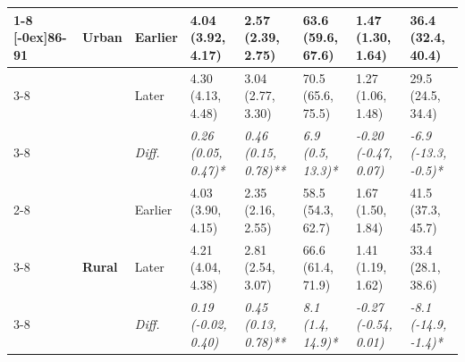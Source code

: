 \documentclass[12pt, a4paper]{article}
\begin{document}
\begin{appendices}
\begin{table}[!p]
{\begin{tabular}[t]{>{}l>{}lllllll}
        \cmidrule{1-8}
        \multirow{9}{*}[-0ex]{\textbf{86-91}} & \multirow{3}{*}{\textbf{Urban}} & Earlier                       & 4.04 (3.92, 4.17)                           & 2.57 (2.39, 2.75)                            & 63.6 (59.6, 67.6)                           & 1.47 (1.30, 1.64)                               & 36.4 (32.4, 40.4)                              \\
        \cmidrule{3-8}
                                              &                                 & Later                         & 4.30 (4.13, 4.48)                           & 3.04 (2.77, 3.30)                            & 70.5 (65.6, 75.5)                           & 1.27 (1.06, 1.48)                               & 29.5 (24.5, 34.4)                              \\
        \cmidrule{3-8}
                                              &                                 & \cellcolor{gray!10}\em{Diff.} & \cellcolor{gray!10}\em{0.26 (0.05, 0.47)*}  & \cellcolor{gray!10}\em{0.46 (0.15, 0.78)**}  & \cellcolor{gray!10}\em{6.9 (0.5, 13.3)*}    & \cellcolor{gray!10}\em{-0.20 (-0.47, 0.07)}     & \cellcolor{gray!10}\em{-6.9 (-13.3, -0.5)*}    \\
        \cmidrule{2-8}
                                              & \multirow{3}{*}{\textbf{Rural}} & Earlier                       & 4.03 (3.90, 4.15)                           & 2.35 (2.16, 2.55)                            & 58.5 (54.3, 62.7)                           & 1.67 (1.50, 1.84)                               & 41.5 (37.3, 45.7)                              \\
        \cmidrule{3-8}
                                              &                                 & Later                         & 4.21 (4.04, 4.38)                           & 2.81 (2.54, 3.07)                            & 66.6 (61.4, 71.9)                           & 1.41 (1.19, 1.62)                               & 33.4 (28.1, 38.6)                              \\
        \cmidrule{3-8}
                                              &                                 & \cellcolor{gray!10}\em{Diff.} & \cellcolor{gray!10}\em{0.19 (-0.02, 0.40)}  & \cellcolor{gray!10}\em{0.45 (0.13, 0.78)**}  & \cellcolor{gray!10}\em{8.1 (1.4, 14.9)*}    & \cellcolor{gray!10}\em{-0.27 (-0.54, 0.01)}     & \cellcolor{gray!10}\em{-8.1 (-14.9, -1.4)*}    \\
        \bottomrule
      \end{tabular}}
  \end{table}
  \vspace*{\fill}


\end{appendices}
\end{document}
